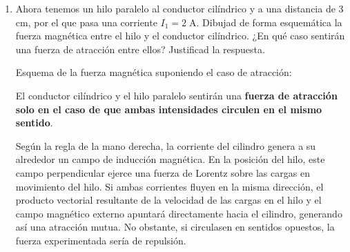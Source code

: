 \documentclass[11pt, a4paper]{article}
\newenvironment{problem}[1][Cuestión]{
	\vspace{0.5cm}
	\noindent{\Large\bfseries #1} \par\vspace{0.5cm}
}{
	\vspace{0.5cm}
}
\begin{document}
\begin{problem}[Cuestión 7]
\begin{enumerate}[label=\alph*)]
			\item Ahora tenemos un hilo paralelo al conductor cilíndrico y a una distancia de 3 cm, por el que pasa una corriente $I_1 = 2 \; \text{A}$. Dibujad de forma esquemática la fuerza magnética entre el hilo y el conductor cilíndrico. ¿En qué caso sentirán una fuerza de atracción entre ellos? Justificad la respuesta.

				{ \color{blue} 
					Esquema de la fuerza magnética suponiendo el caso de atracción:

					\begin{center}
					\end{center}

					El conductor cilíndrico y el hilo paralelo sentirán una \textbf{fuerza de atracción solo en el caso de que ambas intensidades circulen en el mismo sentido}.

					Según la regla de la mano derecha, la corriente del cilindro genera a su alrededor un campo de inducción magnética. En la posición del hilo, este campo perpendicular ejerce una fuerza de Lorentz sobre las cargas en movimiento del hilo. Si ambas corrientes fluyen en la misma dirección, el producto vectorial resultante de la velocidad de las cargas en el hilo y el campo magnético externo apuntará directamente hacia el cilindro, generando así una atracción mutua. No obstante, si circulasen en sentidos opuestos, la fuerza experimentada sería de repulsión.
				}
		\end{enumerate}
	\end{problem}
\end{document}
